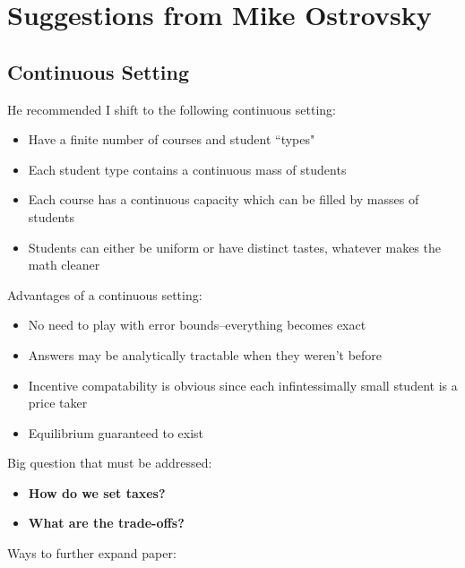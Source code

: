 \documentclass{article}
\begin{document}
\section{Suggestions from Mike Ostrovsky}

\subsection{Continuous Setting}

He recommended I shift to the following continuous setting:

\begin{itemize}
    \item Have a finite number of courses and student ``types"
    
    \item Each student type contains a continuous mass of students
    
    \item Each course has a continuous capacity which can be filled by masses of students
    
    \item Students can either be uniform or have distinct tastes, whatever makes the math cleaner
\end{itemize}

Advantages of a continuous setting:

\begin{itemize}
    \item No need to play with error bounds--everything becomes exact
    
    \item Answers may be analytically tractable when they weren't before
    
    \item Incentive compatability is obvious since each infintessimally small student is a price taker
    
    \item Equilibrium guaranteed to exist
\end{itemize}

Big question that must be addressed:

\begin{itemize}
    \item \textbf{How do we set taxes?}
    
    \item \textbf{What are the trade-offs?}
\end{itemize}

Ways to further expand paper:
\end{document}
